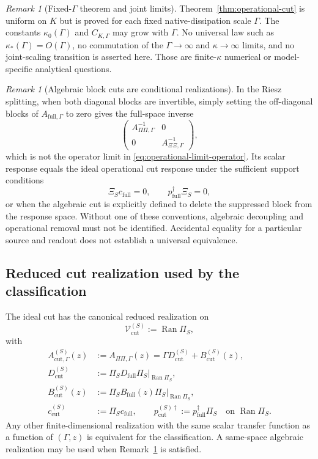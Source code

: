 \documentclass[11pt]{article}
\theoremstyle{definition}
\theoremstyle{remark}
\newtheorem{remark}[theorem]{Remark}
\theoremstyle{plain}
\newcommand{\V}{\mathcal V}
\newcommand{\Ran}{\operatorname{Ran}}
\newcommand{\full}{\mathrm{full}}
\newcommand{\cut}{\mathrm{cut}}
\begin{document}
\begin{remark}[Fixed-$\Gamma$ theorem and joint limits]\label{rem:joint-limit}
Theorem~\ref{thm:operational-cut} is uniform on $K$ but is proved for each fixed native-dissipation scale $\Gamma$.  The constants $\kappa_0(\Gamma)$ and $C_{K,\Gamma}$ may grow with $\Gamma$.  No universal law such as $\kappa_*(\Gamma)=O(\Gamma)$, no commutation of the $\Gamma\to\infty$ and $\kappa\to\infty$ limits, and no joint-scaling transition is asserted here.  Those are finite-$\kappa$ numerical or model-specific analytical questions.
\end{remark}

\begin{remark}[Algebraic block cuts are conditional realizations]\label{rem:algebraic-operational}
In the Riesz splitting, when both diagonal blocks are invertible, simply setting the off-diagonal blocks of $A_{\full,\Gamma}$ to zero gives the full-space inverse
\[
  \begin{pmatrix}
    A_{\Pi\Pi,\Gamma}^{-1}&0\\
    0&A_{\Xi\Xi,\Gamma}^{-1}
  \end{pmatrix},
\]
which is not the operator limit in \eqref{eq:operational-limit-operator}.  Its scalar response equals the ideal operational cut response under the sufficient support conditions
\begin{equation}\label{eq:retained-support}
  \Xi_Sc_{\full}=0,
  \qquad
  p_{\full}^{\dagger}\Xi_S=0,
\end{equation}
or when the algebraic cut is explicitly defined to delete the suppressed block from the response space.  Without one of these conventions, algebraic decoupling and operational removal must not be identified.  Accidental equality for a particular source and readout does not establish a universal equivalence.
\end{remark}

\subsection{Reduced cut realization used by the classification}\label{subsec:cut-realization}
The ideal cut has the canonical reduced realization on
\[
  \V_{\cut}^{(S)}:=\Ran\Pi_S,
\]
with
\begin{align}
  A_{\cut,\Gamma}^{(S)}(z)
  &:=A_{\Pi\Pi,\Gamma}(z)
    =\Gamma D_{\cut}^{(S)}+B_{\cut}^{(S)}(z),\label{eq:cut-family}\\
  D_{\cut}^{(S)}
  &:=\Pi_SD_{\full}\Pi_S\big|_{\Ran\Pi_S},\\
  B_{\cut}^{(S)}(z)
  &:=\Pi_SB_{\full}(z)\Pi_S\big|_{\Ran\Pi_S},\\
  c_{\cut}^{(S)}&:=\Pi_Sc_{\full},
  \qquad
  p_{\cut}^{(S)\dagger}:=p_{\full}^{\dagger}\Pi_S
  \quad\text{on }\Ran\Pi_S.
\end{align}
Any other finite-dimensional realization with the same scalar transfer function as a function of $(\Gamma,z)$ is equivalent for the classification.  A same-space algebraic realization may be used when Remark~\ref{rem:algebraic-operational} is satisfied.
\end{document}
